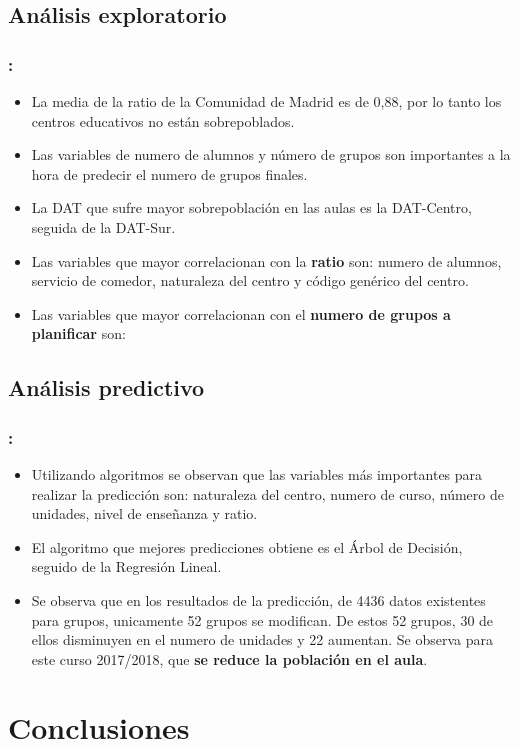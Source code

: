 \documentclass{beamer}
\begin{document}
\subsection{Análisis exploratorio}
\begin{frame}
\frametitle{\secname : \subsecname}
 \begin{itemize}
 	\item La media de la ratio de la Comunidad de Madrid es de 0,88, por lo tanto los centros educativos no están sobrepoblados.
 	\item Las variables de numero de alumnos y número de grupos son importantes a la hora de predecir el numero de grupos finales.
 	\item La DAT que sufre mayor sobrepoblación en las aulas es la DAT-Centro, seguida de la DAT-Sur.
 	\item Las variables que mayor correlacionan con la \textbf{ratio} son: numero de alumnos, servicio de comedor, naturaleza del centro y código genérico del centro.
 	\item Las variables que mayor correlacionan con el\textbf{ numero de grupos a planificar} son:
 \end{itemize}
 

\end{frame}
\subsection{Análisis predictivo}
\begin{frame}
\frametitle{\secname : \subsecname}
\begin{itemize}
	\item Utilizando algoritmos se observan que las variables más importantes para realizar la predicción son: naturaleza del centro, numero de curso, número de unidades, nivel de enseñanza y ratio.
	\item El algoritmo que mejores predicciones obtiene es el Árbol de Decisión, seguido de la Regresión Lineal.
	\item Se observa que en los resultados de la predicción, de 4436 datos existentes para grupos, unicamente 52 grupos se modifican. De estos 52 grupos, 30 de ellos disminuyen en el numero de unidades y 22 aumentan. Se observa para este curso 2017/2018, que  \textbf{se reduce la población en el aula}.
\end{itemize}

\end{frame}

\section{Conclusiones}
\end{document}
